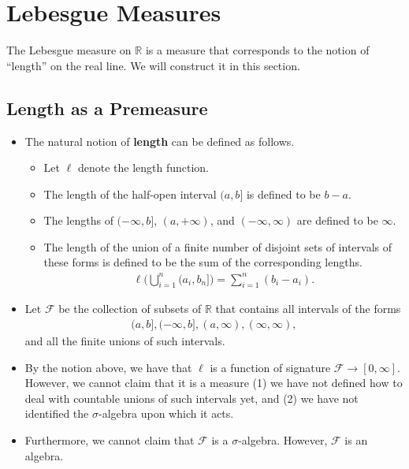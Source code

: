 \documentclass[10pt]{article}
\newcommand{\mcal}[1]{\mathcal{#1}}
\newcommand{\Real}{\mathbb{R}}
\begin{document}
\section{Lebesgue Measures}

The Lebesgue measure on $\Real$ is a measure that corresponds to the notion of ``length'' on the real line. We will construct it in this section.

\subsection{Length as a Premeasure}

\begin{itemize}  
  \item The natural notion of {\bf length} can be defined as follows.
  \begin{itemize}
    \item Let $\ell$ denote the length function.
    \item The length of the half-open interval $(a,b]$ is defined to be $b - a$. 
    \item The lengths of $(-\infty, b]$, $(a, +\infty)$, and $(-\infty, \infty)$ are defined to be $\infty$.
    \item The length of the union of a finite number of disjoint sets of intervals of these forms is defined to be the sum of the corresponding lengths.
    \begin{align*}
      \ell \bigg( \bigcup_{i=1}^n (a_i, b_n] \bigg) = \sum_{i=1}^n (b_i - a_i).
    \end{align*}  
  \end{itemize}

  \item Let $\mcal{F}$ be the collection of subsets of $\Real$ that contains all intervals of the forms
  \begin{align}
    (a,b], (-\infty,b], (a,\infty), (\infty,\infty) \label{half-open-intervals-spec}, 
  \end{align} and all the finite unions of such intervals.  

  \item By the notion above, we have that $\ell$ is a function of signature $\mcal{F} \rightarrow [0,\infty]$. However, we cannot claim that it is a measure (1) we have not defined how to deal with countable unions of such intervals yet, and (2) we have not identified the $\sigma$-algebra upon which it acts.
  
  \item Furthermore, we cannot claim that $\mcal{F}$ is a $\sigma$-algebra. However, $\mcal{F}$ is an algebra.
  

\end{itemize}
\end{document}
